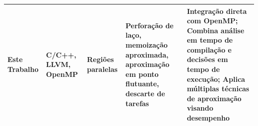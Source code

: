 \begin{table}[htb]
\begin{tabular}{|p{2.3cm}|p{3cm}|p{2cm}|p{3cm}|p{4cm}|}
        \hline
        \textbf{Este Trabalho}                    & \textbf{C/C++, LLVM, OpenMP}        & \textbf{Regiões paralelas}     & \textbf{Perforação de laço, memoização aproximada, aproximação em ponto flutuante, descarte de tarefas} & \textbf{Integração direta com OpenMP; Combina análise em tempo de compilação e decisões em tempo de execução; Aplica múltiplas técnicas de aproximação visando desempenho} \\
        \hline
    \end{tabular}
    \fonte{}
    \label{tab:trabComp}
\end{table}
